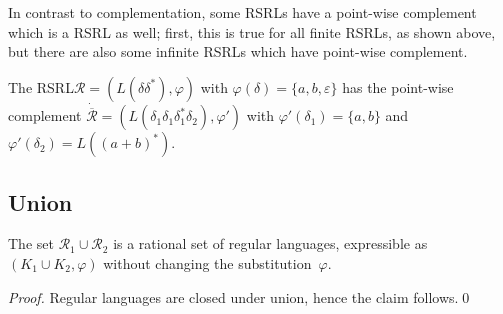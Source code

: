 \documentclass[envcountsame]{llncs}
\newcommand{\rationalset}{\ensuremath{\mathcal{R}}\xspace}
\newcommand{\RegularlyGeneratedLanguageSet}{rational set of regular languages\xspace}
\newcommand{\RegularlyGeneratedLanguageSetAbbrev}{RSRL\xspace}
\newcommand{\RegularlyGeneratedLanguageSetsAbbrev}{RSRLs\xspace}
\begin{document}
In contrast to complementation, some \RegularlyGeneratedLanguageSetsAbbrev have a point-wise
complement which is a \RegularlyGeneratedLanguageSetAbbrev as well; first, this is true for
all finite \RegularlyGeneratedLanguageSetsAbbrev, as shown above, but there are also some
infinite \RegularlyGeneratedLanguageSetsAbbrev which have point-wise complement.

\begin{example}
  The \RegularlyGeneratedLanguageSetAbbrev $\rationalset = (L(\delta\delta^*), \varphi)$ with
  $\varphi(\delta) = \{a, b, \varepsilon\}$ has the point-wise
  complement
  $\dot{\overline{\rationalset}}=(L(\delta_1\delta_1\delta_1^*\delta_2),
  \varphi')$ with $\varphi'(\delta_1) = \{a, b\}$ and
  $\varphi'(\delta_2) = L((a + b)^*)$.
\end{example}



\subsection{Union}
\label{sec:union}


\begin{proposition}
  \label{prop:closure:union}
  The set $\rationalset_1 \cup \rationalset_2$ is a \RegularlyGeneratedLanguageSet,
  expressible as $(K_1 \cup K_2, \varphi)$ without changing the
  substitution~$\varphi$.
\end{proposition}

\begin{proof}
  Regular languages are closed under union, hence the claim
  follows.\qed
\end{proof}
\end{document}
